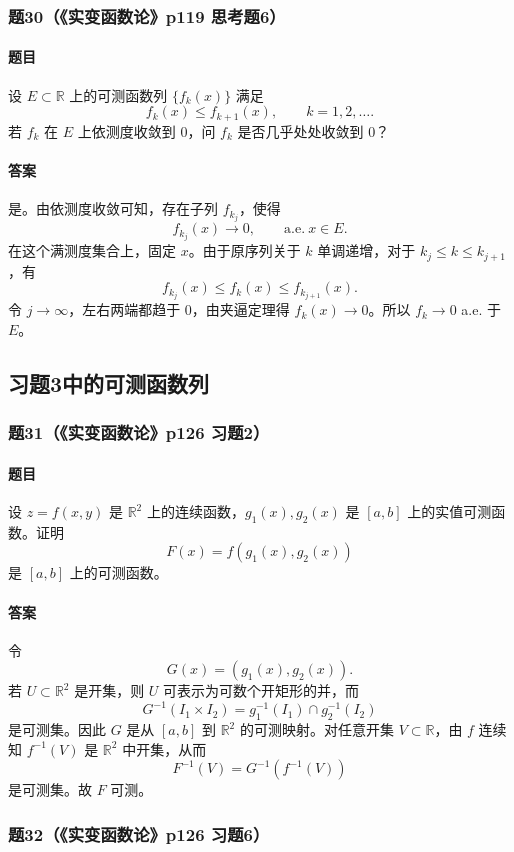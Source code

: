 \documentclass{article}
\newcommand{\R}{\mathbb{R}}
\newcommand{\aee}{\text{a.e.}}
\begin{document}
\subsubsection*{题30（《实变函数论》p119 思考题6）}
\paragraph{题目}设 $E\subset\R$ 上的可测函数列 $\{f_k(x)\}$ 满足
\[
f_k(x)\le f_{k+1}(x),\qquad k=1,2,\ldots.
\]
若 $f_k$ 在 $E$ 上依测度收敛到 $0$，问 $f_k$ 是否几乎处处收敛到 $0$？

\paragraph{答案}是。由依测度收敛可知，存在子列 $f_{k_j}$，使得
\[
f_{k_j}(x)\to0,
\qquad \aee\ x\in E.
\]
在这个满测度集合上，固定 $x$。由于原序列关于 $k$ 单调递增，对于 $k_j\le k\le k_{j+1}$，有
\[
f_{k_j}(x)\le f_k(x)\le f_{k_{j+1}}(x).
\]
令 $j\to\infty$，左右两端都趋于 $0$，由夹逼定理得 $f_k(x)\to0$。所以 $f_k\to0$ a.e. 于 $E$。

\subsection{习题3中的可测函数列}

\subsubsection*{题31（《实变函数论》p126 习题2）}
\paragraph{题目}设 $z=f(x,y)$ 是 $\R^2$ 上的连续函数，$g_1(x),g_2(x)$ 是 $[a,b]$ 上的实值可测函数。证明
\[
F(x)=f(g_1(x),g_2(x))
\]
是 $[a,b]$ 上的可测函数。

\paragraph{答案}令
\[
G(x)=(g_1(x),g_2(x)).
\]
若 $U\subset\R^2$ 是开集，则 $U$ 可表示为可数个开矩形的并，而
\[
G^{-1}(I_1\times I_2)=g_1^{-1}(I_1)\cap g_2^{-1}(I_2)
\]
是可测集。因此 $G$ 是从 $[a,b]$ 到 $\R^2$ 的可测映射。对任意开集 $V\subset\R$，由 $f$ 连续知 $f^{-1}(V)$ 是 $\R^2$ 中开集，从而
\[
F^{-1}(V)=G^{-1}(f^{-1}(V))
\]
是可测集。故 $F$ 可测。

\subsubsection*{题32（《实变函数论》p126 习题6）}
\end{document}

